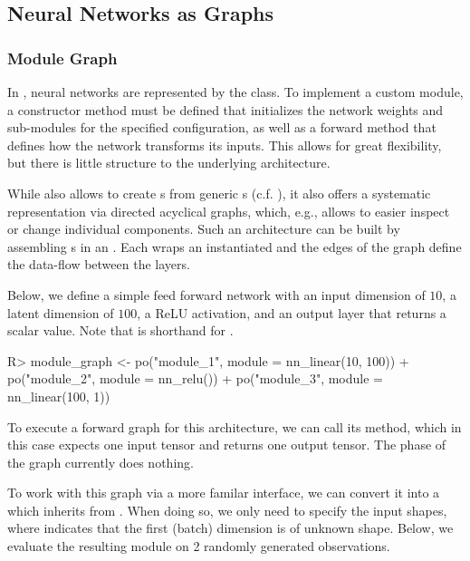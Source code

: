 \documentclass[article]{jss}
\theoremstyle{definition}
\begin{document}
\subsection{Neural Networks as Graphs}

\subsubsection{Module Graph}

In , neural networks are represented by the  class.
To implement a custom module, a constructor method must be defined that initializes the network weights and sub-modules for the specified configuration, as well as a forward method that defines how the network transforms its inputs.
This allows for great flexibility, but there is little structure to the underlying architecture.

While  also allows to create s from generic s (c.f. ), it also offers a systematic representation via directed acyclical graphs, which, e.g., allows to easier inspect or change individual components.
Such an architecture can be built by assembling s in an .
Each  wraps an instantiated  and the edges of the graph define the data-flow between the layers.

Below, we define a simple feed forward network with an input dimension of $10$, a latent dimension of $100$, a ReLU activation, and an output layer that returns a scalar value.
Note that  is shorthand for .

\begin{CodeInput}
R> module_graph <- po("module_1", module = nn_linear(10, 100)) %
+   po("module_2", module = nn_relu()) %
+   po("module_3", module = nn_linear(100, 1))
\end{CodeInput}

To execute a forward graph for this architecture, we can call its  method, which in this case expects one input tensor and returns one output tensor.
The  phase of the graph currently does nothing.

To work with this graph via a more familar interface, we can convert it into a  which inherits from .
When doing so, we only need to specify the input shapes, where  indicates that the first (batch) dimension is of unknown shape.
Below, we evaluate the resulting module on 2 randomly generated observations.
\end{document}
